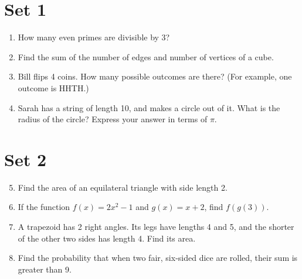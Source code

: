 \documentclass[11pt]{article}
\theoremstyle{definition}
\newcommand{\fdbox}[2]{\fbox{\sffamily\LARGE\vphantom y#1: \bfseries #2} \par\vspace{1em}} %
\begin{document}
\newcommand{\logo}{%
\begin{minipage}[b]{22em}
\centering\noindent
\\[0.5em]
\begin{minipage}[t][4em][t]{12em} \centering
{\huge \bfseries ${\bf 26^{\text{th}}}$ TJIMO } \\
\textsc{\large Alexandria, Virginia}
\end{minipage}
\end{minipage}
\vspace*{-0.05em}
}
\newcommand{\sevenpoints}{}
\newcommand{\righthead}{\fdbox{Round}{Practice Guts}}


\section*{Set 1}
\begin{enumerate}

\item How many even primes are divisible by 3?
\item Find the sum of the number of edges and number of vertices of a cube.
\item Bill flips 4 coins. How many possible outcomes are there? (For example, one outcome is HHTH.)
\item Sarah has a string of length 10, and makes a circle out of it. What is the radius of the circle? Express your answer in terms of $\pi$.

\end{enumerate}

\eject

\section*{Set 2}
\begin{enumerate}
\setcounter{enumi}{4}
\item Find the area of an equilateral triangle with side length 2.
\item If the function $f(x) = 2x^2 - 1$ and $g(x) = x + 2$, find $f(g(3))$.
\item A trapezoid has 2 right angles. Its legs have lengths 4 and 5, and the shorter of the other two sides has length 4. Find its area.
\item Find the probability that when two fair, six-sided dice are rolled, their sum is greater than 9.
\end{enumerate}

\eject
\end{document}
